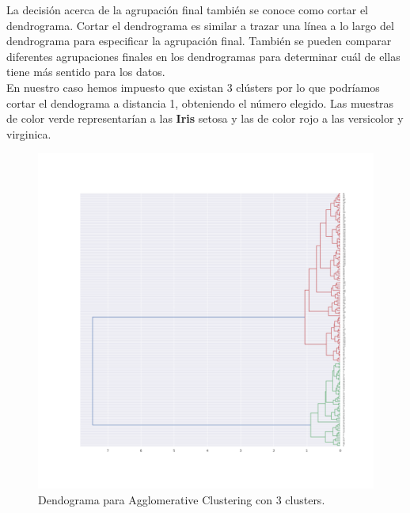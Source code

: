 \documentclass[a4paper, 20pt]{article}
\begin{document}
La decisión acerca de la agrupación final también se conoce como cortar el dendrograma. Cortar el dendrograma es similar a trazar una línea a lo largo del dendrograma para especificar la agrupación final. También se pueden comparar diferentes agrupaciones finales en los dendrogramas para determinar cuál de ellas tiene más sentido para los datos.\\

En nuestro caso hemos impuesto que existan 3 clústers por lo que podríamos cortar el dendograma a distancia 1, obteniendo el número elegido. Las muestras de color verde representarían a las \textbf{Iris} setosa y las de color rojo a las versicolor y virginica.

\begin{figure}[h]
\centering
\includegraphics[scale=0.35]{dani/dendrogramAggClusterIRIS.png}
\caption{Dendograma para Agglomerative Clustering con 3 clusters.}
\label{dac}
\end{figure}

\clearpage
\end{document}
